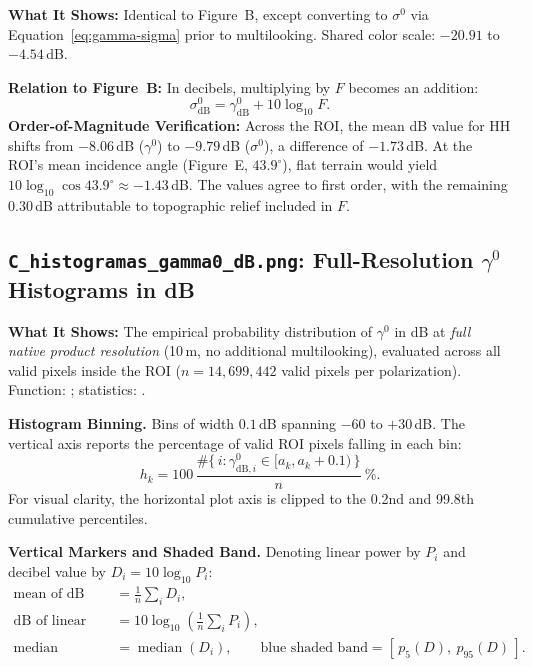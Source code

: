 \documentclass[11pt,a4paper]{article}
\newcommand{\gz}{\ensuremath{\gamma^{0}}}
\newcommand{\sz}{\ensuremath{\sigma^{0}}}
\begin{document}
\textbf{What It Shows:} Identical to Figure~B, except converting to \sz{} via Equation~\eqref{eq:gamma-sigma} prior to multilooking. Shared color scale: $-20.91$ to $-4.54$\,dB.

\textbf{Relation to Figure~B:} In decibels, multiplying by $F$ becomes an addition:
\begin{equation}
  \sigma^0_{\text{dB}} = \gamma^0_{\text{dB}} + 10\log_{10} F .
\end{equation}
\textbf{Order-of-Magnitude Verification:} Across the ROI, the mean dB value for HH shifts from $-8.06$\,dB (\gz) to $-9.79$\,dB (\sz), a difference of $-1.73$\,dB. At the ROI's mean incidence angle (Figure~E, $43.9^\circ$), flat terrain would yield $10\log_{10}\cos 43.9^\circ \approx -1.43$\,dB. The values agree to first order, with the remaining $0.30$\,dB attributable to topographic relief included in $F$.

\subsection{\texttt{C\_histogramas\_gamma0\_dB.png}: Full-Resolution \gz{} Histograms in dB}

\textbf{What It Shows:} The empirical probability distribution of \gz{} in dB at \emph{full native product resolution} (10\,m, no additional multilooking), evaluated across all valid pixels inside the ROI ($n = 14,699,442$ valid pixels per polarization). Function: ; statistics: .

\textbf{Histogram Binning.} Bins of width $0.1$\,dB spanning $-60$ to $+30$\,dB. The vertical axis reports the percentage of valid ROI pixels falling in each bin:
\begin{equation}
  h_k = 100\,\frac{\#\{\,i : \gamma^0_{\text{dB},i} \in [a_k, a_k + 0.1)\,\}}{n}\ \mathrm{\%}.
\end{equation}
For visual clarity, the horizontal plot axis is clipped to the 0.2nd and 99.8th cumulative percentiles.

\textbf{Vertical Markers and Shaded Band.} Denoting linear power by $P_i$ and decibel value by $D_i = 10\log_{10}P_i$:
\begin{align}
  \text{mean of dB} &= \frac{1}{n}\sum_i D_i, \\
  \text{dB of linear mean} &= 10\log_{10}\!\left(\frac{1}{n}\sum_i P_i\right), \\
  \text{median} &= \operatorname{median}(D_i), \qquad \text{blue shaded band} = [\,p_5(D),\ p_{95}(D)\,].
\end{align}
\end{document}
